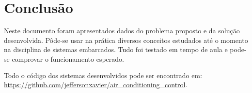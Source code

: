 \documentclass[journal,transmag]{IEEEtran}
\begin{document}
\section{Conclusão}
Neste documento foram apresentados dados do problema proposto e da solução desenvolvida. Pôde-se usar na prática diversos conceitos estudados até o momento na disciplina de sistemas embarcados. Tudo foi testado em tempo de aula e pode-se comprovar o funcionamento esperado.

Todo o código dos sistemas desenvolvidos pode ser encontrado em: \url{https://github.com/jeffersonxavier/air_conditioning_control}.
\end{document}
